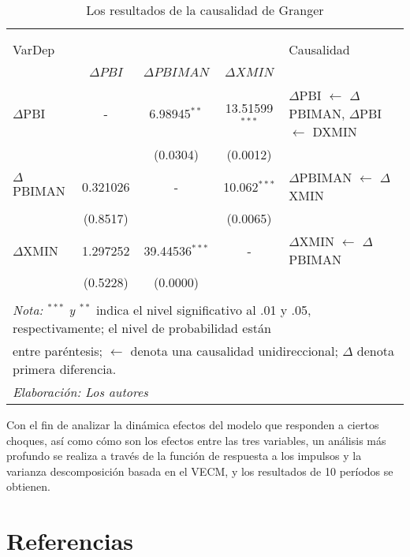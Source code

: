 \documentclass[11pt,]{article}
\begin{document}
\begin{table}[!htbp] \centering 
  \caption{Los resultados de la causalidad de Granger} 
  \label{tab:tb7} 
\small 
\begin{tabular}{@{\extracolsep{5pt}} lcccl} 
\\[-1.8ex]\hline 
\hline \\[-1.8ex] 
\\[-1.8ex] VarDep &   &  &  &Causalidad\\
\\[-1.8ex] & $\Delta PBI$  &  $\Delta PBIMAN$ & $\Delta XMIN$ &\\
\hline \\[-1.8ex] 
$\Delta$PBI & - & 6.98945$^{**}$ & 13.51599$^{***}$ & $\Delta$PBI $\leftarrow$ $\Delta$PBIMAN, $\Delta$PBI $\leftarrow$ DXMIN \\ 
 &  & (0.0304) & (0.0012) &  \\ 
$\Delta$PBIMAN & 0.321026 & - & 10.062$^{***}$ & $\Delta$PBIMAN $\leftarrow$ $\Delta$XMIN \\ 
 & (0.8517) &  & (0.0065) &  \\ 
$\Delta$XMIN & 1.297252 & 39.44536$^{***}$ & - & $\Delta$XMIN $\leftarrow$ $\Delta$PBIMAN \\ 
 & (0.5228) & (0.0000) &  &  \\ 
\hline \\[-1.8ex] 
\multicolumn{5}{l}{\footnotesize{\textit{Nota: $^{***}$ y $^{**}$} indica el nivel significativo al .01 y .05, respectivamente; el nivel de probabilidad están}} \\ 
\multicolumn{5}{l}{\footnotesize{entre paréntesis; $\leftarrow$ denota una causalidad unidireccional; $\Delta$ denota primera diferencia.}} \\ 
\multicolumn{5}{l}{\footnotesize{\textit{Elaboración: Los autores}}} \\ 
\end{tabular} 
\end{table}

Con el fin de analizar la dinámica efectos del modelo que responden a
ciertos choques, así como cómo son los efectos entre las tres variables,
un análisis más profundo se realiza a través de la función de respuesta
a los impulsos y la varianza descomposición basada en el VECM, y los
resultados de 10 períodos se obtienen.

\newpage

\hypertarget{referencias}{%
\section{Referencias}\label{referencias}}
\end{document}

